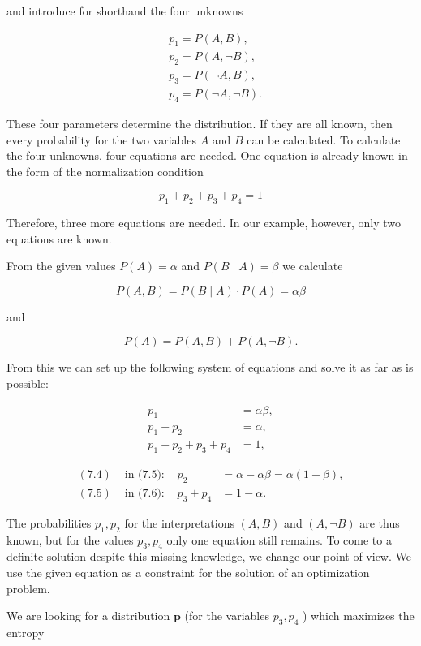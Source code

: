 \documentclass[10pt]{book}
\begin{document}
\begin{center}
\begin{enumerate}
and introduce for shorthand the four unknowns

$$
\begin{aligned}
& p_{1}=P(A, B), \\
& p_{2}=P(A, \neg B), \\
& p_{3}=P(\neg A, B), \\
& p_{4}=P(\neg A, \neg B) .
\end{aligned}
$$

These four parameters determine the distribution. If they are all known, then every probability for the two variables $A$ and $B$ can be calculated. To calculate the four unknowns, four equations are needed. One equation is already known in the form of the normalization condition

$$
p_{1}+p_{2}+p_{3}+p_{4}=1
$$

Therefore, three more equations are needed. In our example, however, only two equations are known.

From the given values $P(A)=\alpha$ and $P(B \mid A)=\beta$ we calculate

$$
P(A, B)=P(B \mid A) \cdot P(A)=\alpha \beta
$$

and

$$
P(A)=P(A, B)+P(A, \neg B) .
$$

From this we can set up the following system of equations and solve it as far as is possible:


\begin{align*}
p_{1} & =\alpha \beta,  \tag{7.4}\\
p_{1}+p_{2} & =\alpha,  \tag{7.5}\\
p_{1}+p_{2}+p_{3}+p_{4} & =1, \tag{7.6}
\end{align*}



\begin{align*}
(7.4) & \text { in (7.5): } & p_{2} & =\alpha-\alpha \beta=\alpha(1-\beta),  \tag{7.7}\\
(7.5) & \text { in (7.6): } & p_{3}+p_{4} & =1-\alpha . \tag{7.8}
\end{align*}


The probabilities $p_{1}, p_{2}$ for the interpretations $(A, B)$ and $(A, \neg B)$ are thus known, but for the values $p_{3}, p_{4}$ only one equation still remains. To come to a definite solution despite this missing knowledge, we change our point of view. We use the given equation as a constraint for the solution of an optimization problem.

We are looking for a distribution $\boldsymbol{p}$ (for the variables $p_{3}, p_{4}$ ) which maximizes the entropy



\end{enumerate}
\end{center}
\end{document}
